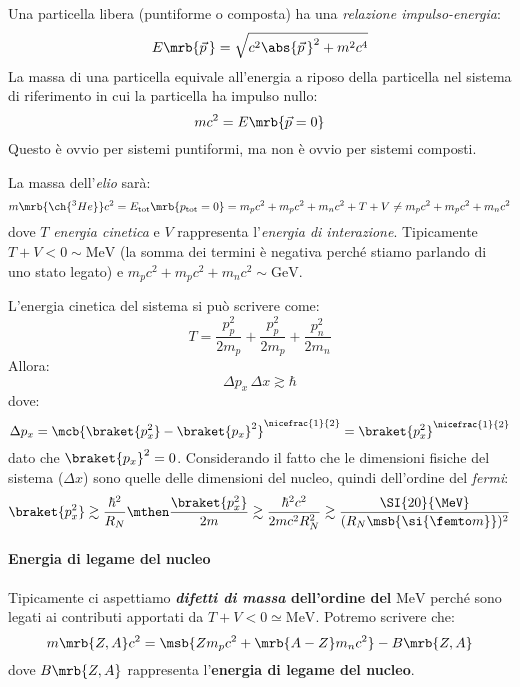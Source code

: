Una particella libera (puntiforme o composta) ha una \textit{relazione
impulso-energia}:
\begin{equation}
  E \mrb{\vec{p}\,} = \sqrt{c^2 \abs{\vec{p}\,}^{2} + m^2 c^4}
\end{equation}
La massa di una particella equivale all'energia a riposo della particella nel
sistema di riferimento in cui la particella ha impulso nullo:
\begin{equation}
  mc^2 = E \mrb{\vec{p} = 0}
\end{equation}
Questo è ovvio per sistemi puntiformi, ma non è ovvio per sistemi composti.
\begin{example}[Nucleo di \ch{^{3}He}]
  La massa dell'\textit{elio}  sarà:
  \begin{equation}
    m \mrb{\ch{^{3}He}} c^2 = E _\text{tot} \mrb{p _\text{tot} = 0}
    = m_p c^2 + m_p c^2 + m_n c^2 + T + V \neq m_p c^2 + m_p c^2 + m_n c^2
  \end{equation}
  dove $T$ \textit{energia cinetica} e $V$ rappresenta l'\textit{energia di
  interazione}.
  Tipicamente $T + V < 0 \sim \si{\MeV}$ (la somma dei termini è negativa
  perché stiamo parlando di uno stato legato) e $m_p c^2 + m_p c^2 + m_n c^2
  \sim \si{\GeV}$.

  L'energia cinetica del sistema si può scrivere come:
  \begin{equation}
    T = \frac{p_p^2}{2 m_p} + \frac{p_p^2}{2 m_p} + \frac{p_n^2}{2 m_n}
  \end{equation}
  Allora:
  \begin{equation}
    \Delta p_x\, \Delta x \gtrsim \hbar
  \end{equation}
  dove:
  \begin{equation}
    \Delta p_x = \mcb{\braket{p_x^2} - \braket{p_x}^{2}}^{\nicefrac{1}{2}} =
    \braket{p_x^2}^{\nicefrac{1}{2}}
  \end{equation}
  dato che $\braket{p_x}^{2} = 0$.
  Considerando il fatto che le dimensioni fisiche del sistema ($\Delta x$) sono
  quelle delle dimensioni del nucleo, quindi dell'ordine del \textit{fermi}:
  \begin{equation}
    \braket{p_x^2} \gtrsim \frac{\hbar^2}{R_N}
    \mthen
    \frac{\braket{p_x^2}}{2m} \gtrsim \frac{\hbar^2 c^2}{2m c^2 R_N^2} \gtrsim
    \frac{\SI{20}{\MeV}}{(R_N \msb{\si{\femto m}})^{2}}
  \end{equation}
\end{example}

\paragraph{Energia di legame del nucleo}
Tipicamente ci aspettiamo \textbf{\textit{difetti di massa} dell'ordine del}
$\si{\MeV}$ perché sono legati ai contributi apportati da $T + V < 0 \simeq
\si{\MeV}$. Potremo scrivere che:
\begin{equation}
  m \mrb{Z, A} c^2 = \msb{Z m_p c^2 + \mrb{A - Z} m_n c^2} - B \mrb{Z, A}
\end{equation}
dove $B \mrb{Z, A}$ rappresenta l'\textbf{energia di legame del nucleo}.

